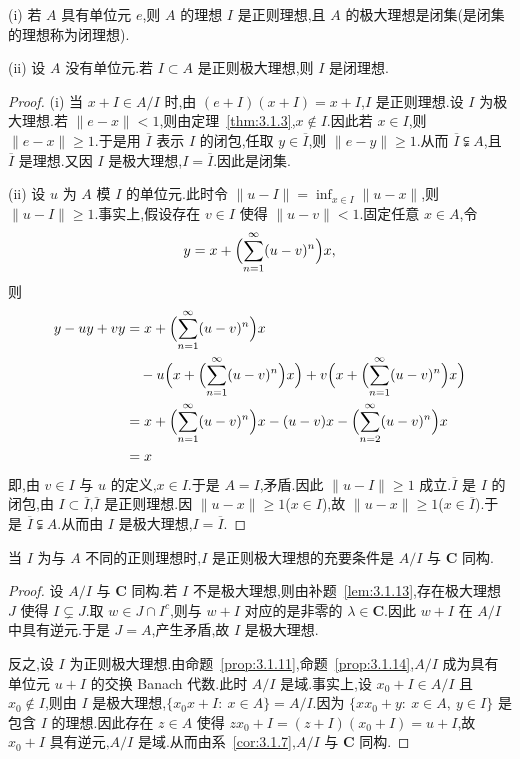 \begin{proposition}\label{prop:3.1.14}

(i) 若 $A$ 具有单位元 $e$,则 $A$ 的理想 $I$ 是正则理想,且 $A$ 的极大理想是闭集(是闭集的理想称为闭理想).

(ii) 设 $A$ 没有单位元.若 $I \subset A$ 是正则极大理想,则 $I$ 是闭理想.
\end{proposition}

\begin{proof}
(i) 当 $x + I \in A/I$ 时,由 $(e + I)(x + I) = x + I$,$I$ 是正则理想.设 $I$ 为极大理想.若 $\|e - x\| < 1$,则由定理~\ref{thm:3.1.3},$x \notin I$.因此若 $x \in I$,则 $\|e - x\| \geq 1$.于是用 $\overline{I}$ 表示 $I$ 的闭包,任取 $y \in \overline{I}$,则 $\|e - y\| \geq 1$.从而 $\overline{I} \subsetneqq A$,且 $\overline{I}$ 是理想.又因 $I$ 是极大理想,$I = \overline{I}$.因此是闭集.

(ii) 设 $u$ 为 $A$ 模 $I$ 的单位元.此时令 $\|u - I\| = \inf_{x \in I}\|u - x\|$,则 $\|u - I\| \geq 1$.事实上,假设存在 $v \in I$ 使得 $\|u - v\| < 1$.固定任意 $x \in A$,令
\begin{equation*}
y = x + \Bigl(\sum_{n=1}^{\infty}(u - v)^{n}\Bigr)x,
\end{equation*}
则
\begin{align*}
y - uy + vy & = x + \Bigl(\sum_{n=1}^{\infty}(u - v)^{n}\Bigr)x \\
& \quad - u\Bigl(x + \Bigl(\sum_{n=1}^{\infty}(u - v)^{n}\Bigr)x\Bigr) + v\Bigl(x + \Bigl(\sum_{n=1}^{\infty}(u - v)^{n}\Bigr)x\Bigr) \\
& = x + \Bigl(\sum_{n=1}^{\infty}(u - v)^{n}\Bigr)x - (u - v)x - \Bigl(\sum_{n=2}^{\infty}(u - v)^{n}\Bigr)x \\
& = x
\end{align*}
即,由 $v \in I$ 与 $u$ 的定义,$x \in I$.于是 $A = I$,矛盾.因此 $\|u - I\| \geq 1$ 成立.$\overline{I}$ 是 $I$ 的闭包,由 $I \subset \overline{I}$,$\overline{I}$ 是正则理想.因 $\|u - x\| \geq 1$($x \in I$),故 $\|u - x\| \geq 1$($x \in \overline{I}$).于是 $\overline{I} \subsetneqq A$.从而由 $I$ 是极大理想,$I = \overline{I}$.
\end{proof}

\begin{lemma}\label{lem:3.1.15}
当 $I$ 为与 $A$ 不同的正则理想时,$I$ 是正则极大理想的充要条件是 $A/I$ 与 $\mathbf{C}$ 同构.
\end{lemma}

\begin{proof}
设 $A/I$ 与 $\mathbf{C}$ 同构.若 $I$ 不是极大理想,则由补题~\ref{lem:3.1.13},存在极大理想 $J$ 使得 $I \subsetneq J$.取 $w \in J \cap I^{c}$,则与 $w + I$ 对应的是非零的 $\lambda \in \mathbf{C}$.因此 $w + I$ 在 $A/I$ 中具有逆元.于是 $J = A$,产生矛盾,故 $I$ 是极大理想.

反之,设 $I$ 为正则极大理想.由命题~\ref{prop:3.1.11},命题~\ref{prop:3.1.14},$A/I$ 成为具有单位元 $u + I$ 的交换 Banach 代数.此时 $A/I$ 是域.事实上,设 $x_{0} + I \in A/I$ 且 $x_{0} \notin I$,则由 $I$ 是极大理想,$\{x_{0}x + I:\ x \in A\} = A/I$.因为 $\{xx_{0} + y:\ x \in A,\ y \in I\}$ 是包含 $I$ 的理想.因此存在 $z \in A$ 使得 $zx_{0} + I = (z + I)(x_{0} + I) = u + I$,故 $x_{0} + I$ 具有逆元,$A/I$ 是域.从而由系~\ref{cor:3.1.7},$A/I$ 与 $\mathbf{C}$ 同构.
\end{proof}

